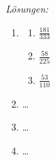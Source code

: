 \clearpage
\emph{Lösungen:}

\begin{enumerate}
    \item
          \begin{enumerate}
              \item \(\frac{181}{333}\)
              \item \(\frac{58}{225}\)
              \item \(\frac{53}{110}\)
          \end{enumerate}

    \item \dots



    \item \dots %

    \item \dots



\end{enumerate}
